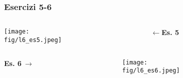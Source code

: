 \documentclass{beamer}
\newcommand{\fig}{./figures} %
\begin{document}
\begin{frame}
\frametitle{Esercizi 5-6}
\begin{columns}
\begin{column}{0.5\textwidth}
\texttt{[image: \\fig/l6\_es5.jpeg]}
\end{column}
\begin{column}{0.5\textwidth}
$\mathbf{\longleftarrow}$\textbf{Es. 5}
\end{column}
\end{columns}
\begin{columns}
\begin{column}{0.5\textwidth}
\textbf{Es. 6}$~\mathbf{\longrightarrow}$
\end{column}
\begin{column}{0.5\textwidth}
\texttt{[image: \\fig/l6\_es6.jpeg]}
\end{column}
\end{columns}
\end{frame}
\end{document}
